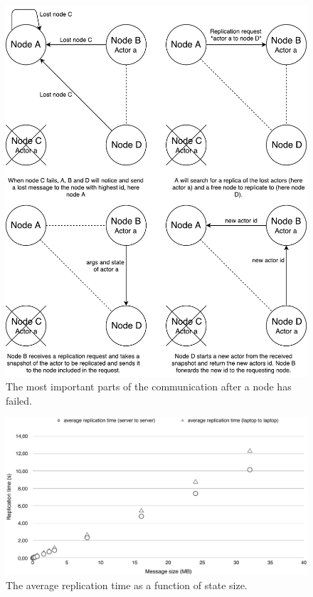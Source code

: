 \documentclass{cslthse-msc}
\begin{document}
\begin{appendices}
\begin{figure}[!hbt]
\centering
\includegraphics[scale=0.5]{images/replication_flow.pdf}
\caption{The most important parts of the communication after a node has failed.} \label{fig:replication_flow}
\end{figure}

\begin{figure}[!hbt]
\centering
\includegraphics[scale=0.5]{images/results/replication_time_less_than_40.pdf} 
\caption{The average replication time as a function of state size.}\label{fig:replication_time_less_than_40}
\end{figure}



\end{appendices}
\end{document}
